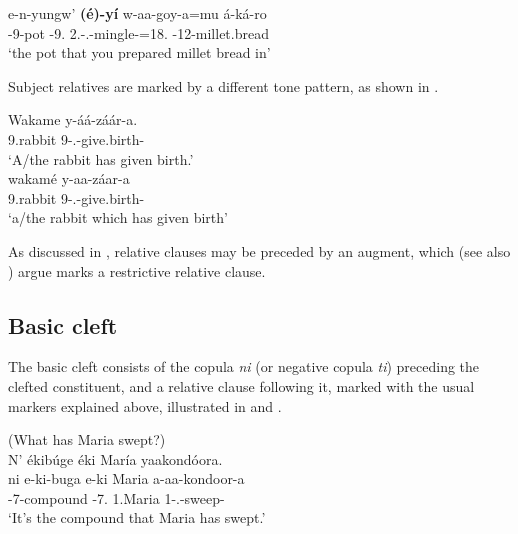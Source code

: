 \documentclass[output=paper]{langscibook}
\begin{document}
\ex
\label{bkm:Ref98922886:b}
\gll
e-n-yungw’  \textbf{(é)-yí}  w-aa-goy-a=mu  á-ká-ro\\
\AUG{}-9-pot  \AUG{}-9\REL{}.\PRO{}  2\SG{}.\SM{}-\N{}.\PST{}-{}mingle-\FV{}=18.\LOC{}  \AUG{}-12-millet.bread\\
\glt
‘the pot that you prepared millet bread in’\\


\z
\z


Subject relatives are marked by a different tone pattern, as shown in .\largerpage[2]

\ea
\citep[1288]{AsiimweEtAl2023}
\label{bkm:Ref98922875}
\ea
\gll
Wakame  y-áá-záár-a.\\
9.rabbit  9\SM{}-\N{}.\PST{}-give.birth-\FV{}\\
\glt
‘A/the rabbit has given birth.’\\


\ex
\gll
wakamé  y-aa-záar-a\\
9.rabbit  9\RM{}-\N{}.\PST{}-give.birth-\FV{}\\
\glt
‘a/the rabbit which has given birth’\\

\z
\z

As discussed in , relative clauses may be preceded by an augment, which \citet{AsiimweEtAl2023} (see also \citealt{Asiimwe2019}) argue marks a restrictive relative clause.

\subsection{Basic cleft}
\label{bkm:Ref111469884}
The basic cleft consists of the copula \textit{ni} (or negative copula \textit{ti}) preceding the clefted constituent, and a relative clause following it, marked with the usual markers explained above, illustrated in  and .

\ea
\label{bkm:Ref111468375}
(What has Maria swept?)\\
N’ ékibúge éki María yaakondóora.\\
\gll
ni   e-ki-buga  e-ki   Maria  a-aa-kondoor-a\\
\COP{}   \AUG{}-7{}-compound  \AUG{}-7\REL{}.\PRO{}   1.Maria   1\SM{}-\N{}.\PST{}-{}sweep-\FV{}\\
\glt
‘It’s the compound that Maria has swept.’\\
\end{document}
